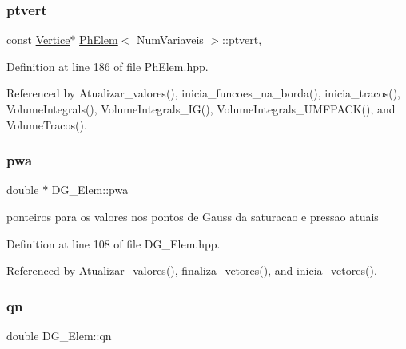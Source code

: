 \mbox{\label{classPhElem_a92acc9f8f36991ce851df5e462425d3c}} 
\subsubsection{\texorpdfstring{ptvert}{ptvert}}
{\footnotesize\ttfamily const \hyperlink{structVertice}{Vertice}$\ast$ \hyperlink{classPhElem}{Ph\+Elem}$<$ Num\+Variaveis $>$\+::ptvert\hspace{0.3cm}{\ttfamily [protected]}, {\ttfamily [inherited]}}



Definition at line 186 of file Ph\+Elem.\+hpp.



Referenced by Atualizar\+\_\+valores(), inicia\+\_\+funcoes\+\_\+na\+\_\+borda(), inicia\+\_\+tracos(), Volume\+Integrals(), Volume\+Integrals\+\_\+\+I\+G(), Volume\+Integrals\+\_\+\+U\+M\+F\+P\+A\+C\+K(), and Volume\+Tracos().

\mbox{\label{classDG__Elem_afc53954789d7ec74b2cf2eb2be590d16}} 
\subsubsection{\texorpdfstring{pwa}{pwa}}
{\footnotesize\ttfamily double $\ast$ D\+G\+\_\+\+Elem\+::pwa\hspace{0.3cm}{\ttfamily [private]}}



ponteiros para os valores nos pontos de Gauss da saturacao e pressao atuais 



Definition at line 108 of file D\+G\+\_\+\+Elem.\+hpp.



Referenced by Atualizar\+\_\+valores(), finaliza\+\_\+vetores(), and inicia\+\_\+vetores().

\mbox{\label{classDG__Elem_a769560386db7e7c3b64d440ed84156be}} 
\subsubsection{\texorpdfstring{qn}{qn}}
{\footnotesize\ttfamily double D\+G\+\_\+\+Elem\+::qn\hspace{0.3cm}{\ttfamily [private]}}



